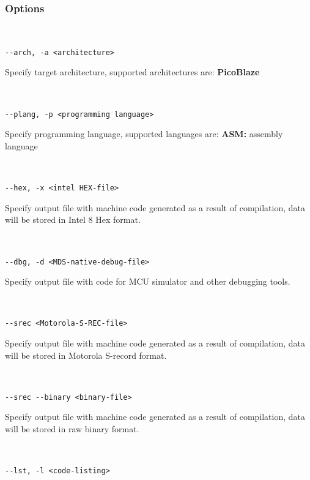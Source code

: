         \subsubsection{Options}
            {
            ~\\
            \usecodefont
            
            \verb'--arch, -a <architecture>'\\
            }
            Specify target architecture, supported architectures are: \textbf{PicoBlaze}
            {
            ~\\
            \usecodefont

            \verb'--plang, -p <programming language>'\\
            }
            Specify programming language, supported languages are: \textbf{ASM:} assembly language
            {
            ~\\
            \usecodefont
            
            \verb'--hex, -x <intel HEX-file>'\\
            }
            Specify output file with machine code generated as a result of compilation, data will be stored in Intel 8 Hex format.
            {
            ~\\
            \usecodefont
            
            \verb'--dbg, -d <MDS-native-debug-file>'\\
            }
            Specify output file with code for MCU simulator and other debugging tools.
            {
            ~\\
            \usecodefont
            
            \verb'--srec <Motorola-S-REC-file>'\\
            }
            Specify output file with machine code generated as a result of compilation, data will be stored in Motorola S-record format.
            {
            ~\\
            \usecodefont
            
            \verb'--srec --binary <binary-file>'\\
            }            
            Specify output file with machine code generated as a result of compilation, data will be stored in raw binary format.
            {
            ~\\
            \usecodefont
            
            \verb'--lst, -l <code-listing>'\\
            }
